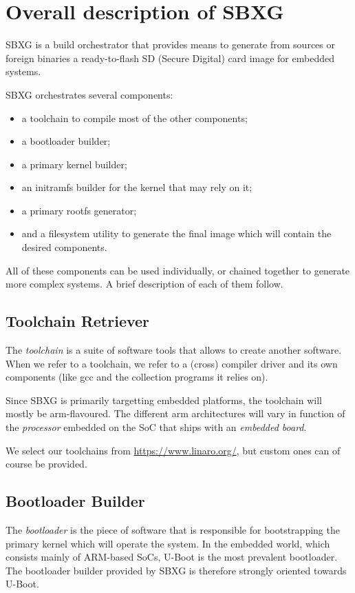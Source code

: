 \documentclass{article}
\begin{document}
\section{Overall description of SBXG}

SBXG is a build orchestrator that provides means to generate from sources or
foreign binaries a ready-to-flash SD (Secure Digital) card image for embedded systems.

SBXG orchestrates several components:
\begin{itemize}
\item a toolchain to compile most of the other components;
\item a bootloader builder;
\item a primary kernel builder;
\item an initramfs builder for the kernel that may rely on it;
\item a primary rootfs generator;
\item and a filesystem utility to generate the final image which will contain the
  desired components.
\end{itemize}

All of these components can be used individually, or chained together to
generate more complex systems. A brief description of each of them follow.

\subsection{Toolchain Retriever}

The \emph{toolchain} is a suite of software tools that allows to create another
software. When we refer to a toolchain, we refer to a (cross) compiler driver
and its own components (like gcc and the collection programs it relies on).

Since SBXG is primarily targetting embedded platforms, the toolchain will mostly
be arm-flavoured. The different arm architectures will vary in function of the
\emph{processor} embedded on the SoC that ships with an \emph{embedded board}.

We select our toolchains from \url{https://www.linaro.org/}, but custom ones can
of course be provided.


\subsection{Bootloader Builder}

The \emph{bootloader} is the piece of software that is responsible for
bootstrapping the primary kernel which will operate the system. In the embedded
world, which consists mainly of ARM-based SoCs, U-Boot is the most prevalent
bootloader. The bootloader builder provided by SBXG is therefore strongly
oriented towards U-Boot.
\end{document}
